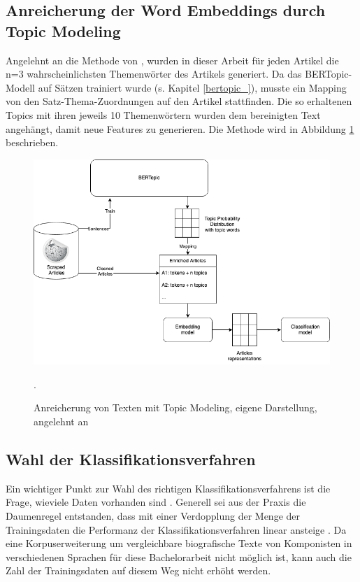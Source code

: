 \documentclass[ngerman]{ttlab-qualify}
\begin{document}
\subsection{Anreicherung der Word Embeddings durch Topic Modeling}
Angelehnt an die Methode von \textcite{alhaj2022improving}, wurden in dieser Arbeit für jeden Artikel die n=3 wahrscheinlichsten Themenwörter des Artikels generiert. Da das BERTopic-Modell auf Sätzen trainiert wurde (s. Kapitel \ref{bertopic_}), musste ein Mapping von den Satz-Thema-Zuordnungen auf den Artikel stattfinden. Die so erhaltenen Topics mit ihren jeweils 10 Themenwörtern wurden dem bereinigten Text angehängt, damit neue Features zu generieren. Die Methode wird in Abbildung \ref{Enriched_articles} beschrieben. 
\begin{figure}[H]
\begin{center}
\includegraphics[width=16cm]{grafiken/Topic_Enriched_Articles(1).png}
\caption[Anreicherung von Texten mit Topic Modeling]{Anreicherung von Texten mit Topic Modeling, eigene Darstellung, angelehnt an \textcite[4]{alhaj2022improving}}.
\label{Enriched_articles}
\end{center}
\end{figure}
\subsection{Wahl der Klassifikationsverfahren}
Ein wichtiger Punkt zur Wahl des richtigen Klassifikationsverfahrens ist die Frage, wieviele Daten vorhanden sind \parencite{manning2008introduction}. Generell sei aus der Praxis die Daumenregel entstanden, dass mit einer Verdopplung der Menge der Trainingsdaten die Performanz der Klassifikationsverfahren linear ansteige \parencite{manning2008introduction}. Da eine Korpuserweiterung um vergleichbare biografische Texte von Komponisten in verschiedenen Sprachen für diese Bachelorarbeit nicht möglich ist, kann auch die Zahl der Trainingsdaten auf diesem Weg nicht erhöht werden.
\end{document}
